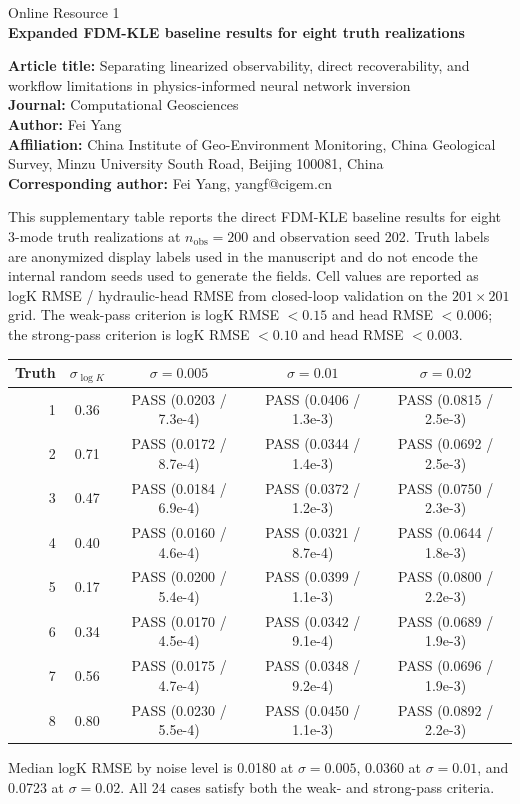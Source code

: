 \documentclass{article}
\begin{document}
\begin{center}
{\Large Online Resource 1}\\[0.5em]
{\bfseries Expanded FDM-KLE baseline results for eight truth realizations}
\end{center}

\noindent\textbf{Article title:} Separating linearized observability, direct recoverability, and workflow limitations in physics-informed neural network inversion\\
\textbf{Journal:} Computational Geosciences\\
\textbf{Author:} Fei Yang\\
\textbf{Affiliation:} China Institute of Geo-Environment Monitoring, China Geological Survey, Minzu University South Road, Beijing 100081, China\\
\textbf{Corresponding author:} Fei Yang, yangf@cigem.cn

\bigskip

This supplementary table reports the direct FDM-KLE baseline results for eight
3-mode truth realizations at $n_{\mathrm{obs}}=200$ and observation seed 202.
Truth labels are anonymized display labels used in the manuscript and do not
encode the internal random seeds used to generate the fields.
Cell values are reported as logK RMSE / hydraulic-head RMSE from closed-loop
validation on the $201 \times 201$ grid. The weak-pass criterion is logK RMSE
$<0.15$ and head RMSE $<0.006$; the strong-pass criterion is logK RMSE $<0.10$
and head RMSE $<0.003$.

\begin{table}[h]
\centering
\small
\setlength{\tabcolsep}{4pt}
\begin{tabular}{@{}rcccc@{}}
\toprule
Truth & $\sigma_{\log K}$ & $\sigma=0.005$ & $\sigma=0.01$ & $\sigma=0.02$ \\
\midrule
1 & 0.36 & PASS (0.0203 / 7.3e-4) & PASS (0.0406 / 1.3e-3) & PASS (0.0815 / 2.5e-3) \\
2 & 0.71 & PASS (0.0172 / 8.7e-4) & PASS (0.0344 / 1.4e-3) & PASS (0.0692 / 2.5e-3) \\
3 & 0.47 & PASS (0.0184 / 6.9e-4) & PASS (0.0372 / 1.2e-3) & PASS (0.0750 / 2.3e-3) \\
4 & 0.40 & PASS (0.0160 / 4.6e-4) & PASS (0.0321 / 8.7e-4) & PASS (0.0644 / 1.8e-3) \\
5 & 0.17 & PASS (0.0200 / 5.4e-4) & PASS (0.0399 / 1.1e-3) & PASS (0.0800 / 2.2e-3) \\
6 & 0.34 & PASS (0.0170 / 4.5e-4) & PASS (0.0342 / 9.1e-4) & PASS (0.0689 / 1.9e-3) \\
7 & 0.56 & PASS (0.0175 / 4.7e-4) & PASS (0.0348 / 9.2e-4) & PASS (0.0696 / 1.9e-3) \\
8 & 0.80 & PASS (0.0230 / 5.5e-4) & PASS (0.0450 / 1.1e-3) & PASS (0.0892 / 2.2e-3) \\
\bottomrule
\end{tabular}
\end{table}

Median logK RMSE by noise level is 0.0180 at $\sigma=0.005$, 0.0360 at
$\sigma=0.01$, and 0.0723 at $\sigma=0.02$. All 24 cases satisfy both the weak-
and strong-pass criteria.
\end{document}
